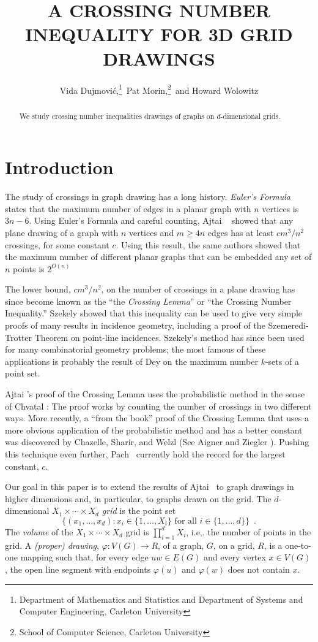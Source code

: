 \documentclass{patmorin}
\title{\MakeUppercase{A Crossing Number Inequality for 3D Grid Drawings}}
\author{Vida Dujmovi\'c,\thanks{Department of Mathematics and Statistics
and Department of Systems and Computer Engineering, Carleton University}\, Pat Morin,\thanks{School of Computer Science, Carleton University}\, and Howard Wolowitz}
\begin{document}
\maketitle

\begin{abstract}
   We study crossing number inequalities drawings of graphs on
   $d$-dimensional grids.
\end{abstract}

\section{Introduction}

The study of crossings in graph drawing has a long history.  \emph{Euler's
Formula} states that the maximum number of edges in a planar graph with
$n$ vertices is $3n-6$.  Using Euler's Formula and careful counting,
Ajtai \etal\ \cite{S} showed that any plane drawing of a graph with $n$
vertices and $m\ge 4n$ edges has at least $c m^3/n^2$ crossings, for
some constant $c$.  Using this result, the same authors showed that the
maximum number of different planar graphs that can be embedded any set
of $n$ points is $2^{O(n)}$

The lower bound, $cm^3/n^2$, on the number of crossings in a plane drawing
has since become known as the ``the \emph{Crossing Lemma}'' or ``the Crossing
Number Inequality.''  Szekely \cite{s} showed that this inequality
can be used to give very simple proofs of many results in incidence
geometry, including a proof of the Szemeredi-Trotter Theorem on point-line
incidences.  Szekely's method has since been used for many combinatorial
geometry problems; the most famous of these applications is probably the
result of Dey \cite{d98} on the maximum number $k$-sets of a point set.

Ajtai \etal's proof of the Crossing Lemma uses the probabilistic method
in the sense of Chvatal \cite{cXX}: The proof works by counting the
number of crossings in two different ways.  More recently, a ``from the
book'' proof of the Crossing Lemma that uses a more obvious application
of the probabilistic method and has a better constant was discovered
by Chazelle, Sharir, and Welzl (See Aigner and Ziegler \cite{azXX}).
Pushing this technique even further, Pach \etal\ currently hold the
record for the largest constant, $c$.

Our goal in this paper is to extend the results of Ajtai \etal\ to graph
drawings in higher dimensions and, in particular, to graphs drawn on
the grid.  The $d$-dimensional \emph{$X_1\times\cdots\times X_d$ grid}
is the point set
\[  \{(x_1,\ldots,x_d): 
      \mbox{$x_i\in\{1,\ldots,X_i\}$ for all $i\in\{1,\ldots,d\}$}\}
	\enspace .\]
The \emph{volume} of the $X_1\times\cdots\times X_d$
grid is $\prod_{i=1}^d X_i$, i.e,. the number of points in the grid.
A \emph{(proper) drawing}, $\varphi:V(G)\rightarrow R$, of a graph, $G$,
on a grid, $R$, is a one-to-one mapping such that, for every edge $uw\in
E(G)$ and every vertex $x\in V(G)$, the open line segment with endpoints
$\varphi(u)$ and $\varphi(w)$ does not contain $x$.
\end{document}
